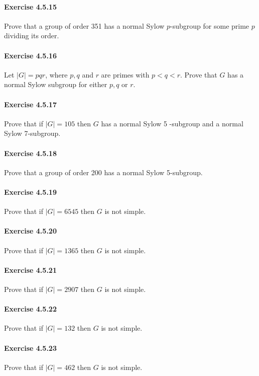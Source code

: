 \documentclass{article}
\begin{document}
\paragraph{Exercise 4.5.15} Prove that a group of order 351 has a normal Sylow $p$-subgroup for some prime $p$ dividing its order.

\paragraph{Exercise 4.5.16} Let $|G|=p q r$, where $p, q$ and $r$ are primes with $p<q<r$. Prove that $G$ has a normal Sylow subgroup for either $p, q$ or $r$.

\paragraph{Exercise 4.5.17} Prove that if $|G|=105$ then $G$ has a normal Sylow 5 -subgroup and a normal Sylow 7-subgroup.

\paragraph{Exercise 4.5.18} Prove that a group of order 200 has a normal Sylow 5-subgroup.

\paragraph{Exercise 4.5.19} Prove that if $|G|=6545$ then $G$ is not simple.

\paragraph{Exercise 4.5.20} Prove that if $|G|=1365$ then $G$ is not simple.

\paragraph{Exercise 4.5.21} Prove that if $|G|=2907$ then $G$ is not simple.

\paragraph{Exercise 4.5.22} Prove that if $|G|=132$ then $G$ is not simple.

\paragraph{Exercise 4.5.23} Prove that if $|G|=462$ then $G$ is not simple.
\end{document}
